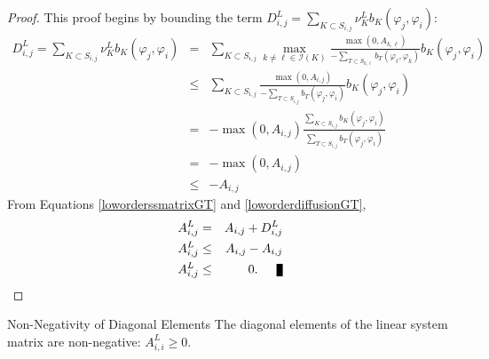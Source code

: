 \begin{proof}
This proof begins by bounding the term
$D_{i,j}^L=\sum\limits_{K\subset S_{i,j}}\nu_K^L b_K(\varphi_j, \varphi_i)$:
\begin{eqnarray*}
   D_{i,j}^L=\sum\limits_{K\subset S_{i,j}}\nu_K^L b_K(\varphi_j, \varphi_i)
   & = & \sum\limits_{K\subset S_{i,j}} \max\limits_{k\ne \ell\in \mathcal{I}(K)}
      \frac{\max(0,A_{k,\ell})}
		{-\sum\limits_{T\subset S_{k,\ell}} b_T(\varphi_{\ell}, \varphi_k)}
      b_K(\varphi_j,\varphi_i)\\
   & \le & \sum\limits_{K\subset S_{i,j}} \frac{\max(0,A_{i,j})}
		{-\sum\limits_{T\subset S_{i,j}} b_T(\varphi_j, \varphi_i)}b_K(\varphi_j,\varphi_i)\\
   & =   & -\max(0,A_{i,j}) \frac{\sum\limits_{K\subset S_{i,j}}
      b_K(\varphi_j,\varphi_i)}
		{\sum\limits_{T\subset S_{i,j}} b_T(\varphi_j, \varphi_i)}\\   
   & = & -\max(0,A_{i,j})\\
   & \le & -A_{i,j}
\end{eqnarray*}
From Equations \eqref{loworderssmatrixGT} and \eqref{loworderdiffusionGT},
\begin{eqnarray*}
	A^L_{i,j} & = & A_{i,j} + D_{i,j}^L\\
   A^L_{i,j} & \le & A_{i,j} - A_{i,j}\\
   A^L_{i,j} & \le & 0.\qed
\end{eqnarray*}
\end{proof}
\begin{lemma}[label={diagonalpositive_gt}]{Non-Negativity of Diagonal Elements}
   The diagonal elements  of the linear system matrix are non-negative: $A^L_{i,i}\ge 0$.
\end{lemma}

